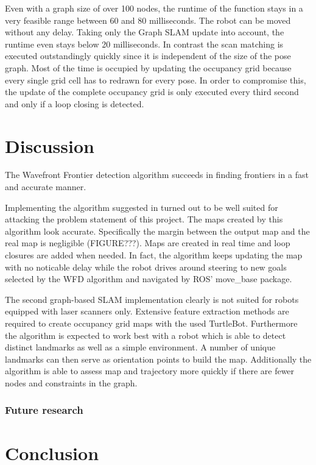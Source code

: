 \documentclass{ba-kecs}
\begin{document}
Even with a graph size of over 100 nodes, the runtime of the function stays in a very feasible range between 60 and 80 milliseconds. The robot can be moved without any delay. Taking only the Graph SLAM update into account, the runtime even stays below 20 milliseconds. In contrast the scan matching is executed outstandingly quickly since it is independent of the size of the pose graph. Most of the time is occupied by updating the occupancy grid because every single grid cell has to redrawn for every pose. In order to compromise this, the update of the complete occupancy grid is only executed every third second and only if a loop closing is detected.
\section{Discussion}
\label{sec:disc}
The Wavefront Frontier detection algorithm \citep{Keidar} succeeds in finding frontiers in a fast and accurate manner.

Implementing the algorithm suggested in \citep{Grisetti} turned out to be well suited for attacking the problem statement of this project. The maps created by this algorithm look accurate. Specifically the margin between the output map and the real map is negligible (FIGURE???). Maps are created in real time and loop closures are added when needed. In fact, the algorithm keeps updating the map with no noticable delay while the robot drives around steering to new goals selected by the WFD algorithm and navigated by ROS' move\_base package.

The second graph-based SLAM implementation \cite{Thrun} clearly is not suited for robots equipped with laser scanners only. Extensive feature extraction methods are required to create occupancy grid maps with the used TurtleBot. Furthermore the algorithm is expected to work best with a robot which is able to detect distinct landmarks as well as a simple environment. A number of unique landmarks can then serve as orientation points to build the map. Additionally the algorithm is able to assess map and trajectory more quickly if there are fewer nodes and constraints in the graph.

\subsubsection{Future research}

\section{Conclusion}
\label{sec:conc}

\nocite{*}
\onecolumn
\appendix
\end{document}
